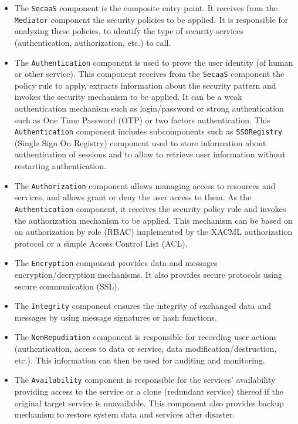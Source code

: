 \documentclass[runningheads,a4paper]{llncs}
\begin{document}
\begin{itemize}

\item The \texttt{SecaaS} component is the composite entry point. It receives from the \texttt{Mediator} component the security policies to be applied. It is responsible for analyzing these policies, to identify the type of security services (authentication, authorization, etc.) to call.
\item The \texttt{Authentication} component is used to prove the user identity (of human or other service). This component receives from the \texttt{SecaaS} component the policy rule to apply, extracts information about the security pattern and invokes the security mechanism to be applied. It can be a weak authentication mechanism such as login/password or strong authentication such as One Time Password (OTP) or two factors authentication. This \texttt{Authentication} component includes subcomponents such as \texttt{SSORegistry} (Single Sign On Registry) component used to store information about  authentication of sessions and to allow to retrieve user information without restarting authentication.

\item The \texttt{Authorization} component allows managing access to resources and services, and allows grant or deny the user access to them. As the \texttt{Authentication} component, it receives the security policy rule and invokes the authorization mechanism to be applied. This mechanism can be based on an authorization by role (RBAC) implemented by the XACML authorization protocol or a simple Access Control List (ACL).
\item The \texttt{Encryption} component provides data and messages encryption/decryption mechanisms. It also provides secure protocols using secure communication (SSL).
\item The \texttt{Integrity} component ensures the integrity of exchanged data and messages by using message signatures or hash functions.
\item The \texttt{NonRepudiation} component is responsible for recording user actions (authentication, access to data or service, data modification/destruction, etc.). This information can then be used for auditing and monitoring.
\item The \texttt{Availability} component is responsible for the services' availability providing access to the service or a clone (redundant service) thereof if the original target service is unavailable. This component also provides backup mechanism to restore system data and services after disaster.

\end{itemize}
\end{document}
